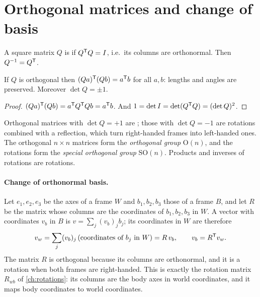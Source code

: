 \section{Orthogonal matrices and change of basis}
\label{sec:orthogonal-matrices}

\begin{definition}
A square matrix $Q$ is  if $Q^{\mathsf{T}} Q = I$, i.e.\ its columns are orthonormal. Then $Q^{-1} = Q^{\mathsf{T}}$.
\end{definition}

\begin{proposition}
If $Q$ is orthogonal then $(Qa)^{\mathsf{T}}(Qb) = a^{\mathsf{T}} b$ for all $a, b$: lengths and angles are preserved. Moreover
$\det Q = \pm1$.
\end{proposition}
\begin{proof}
$(Qa)^{\mathsf{T}}(Qb) = a^{\mathsf{T}} Q^{\mathsf{T}} Qb = a^{\mathsf{T}} b$. And $1 = \det I = \det(Q^{\mathsf{T}} Q) = (\det Q)^2$.
\end{proof}

Orthogonal matrices with $\det Q = +1$ are ; those with $\det Q = -1$ are rotations combined with a
reflection, which turn right-handed frames into left-handed ones. The orthogonal $n\times n$ matrices form the
\emph{orthogonal group} $\mathrm O(n)$, and the rotations form the \emph{special orthogonal group} $\mathrm{SO}(n)$.
Products and inverses of rotations are rotations.

\paragraph{Change of orthonormal basis.} Let $e_1, e_2, e_3$ be the axes of a frame $W$ and $b_1, b_2, b_3$ those of a
frame $B$, and let $R$ be the matrix whose columns are the coordinates of $b_1, b_2, b_3$ in $W$. A vector with
coordinates $v_b$ in $B$ is $v = \sum_j(v_b)_jb_j$; its coordinates in $W$ are therefore
\begin{equation}
  v_w = \sum_j (v_b)_j\,(\text{coordinates of } b_j \text{ in } W) = R\,v_b,
  \qquad v_b = R^{\mathsf{T}} v_w .
\end{equation}
The matrix $R$ is orthogonal because its columns are orthonormal, and it is a rotation when both frames are
right-handed. This is exactly the rotation matrix $R_{wb}$ of \cref{ch:rotations}: its columns are the body axes in world
coordinates, and it maps body coordinates to world coordinates.

